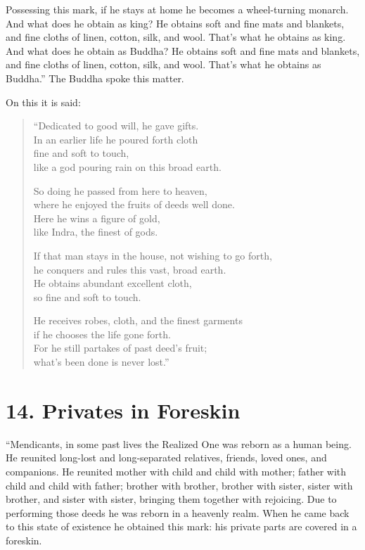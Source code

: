 \documentclass[12pt,openany]{book}%
\begin{document}
Possessing this mark, if he stays at home he becomes a wheel-turning monarch. And what does he obtain as king? He obtains soft and fine mats and blankets, and fine cloths of linen, cotton, silk, and wool. That’s what he obtains as king. And what does he obtain as Buddha? He obtains soft and fine mats and blankets, and fine cloths of linen, cotton, silk, and wool. That’s what he obtains as Buddha.” The Buddha spoke this matter. 

On this it is said: 

\begin{verse}%
“Dedicated to good will, he gave gifts. \\
In an earlier life he poured forth cloth \\
fine and soft to touch, \\
like a god pouring rain on this broad earth. 

So doing he passed from here to heaven, \\
where he enjoyed the fruits of deeds well done. \\
Here he wins a figure of gold, \\
like Indra, the finest of gods. 

If that man stays in the house, not wishing to go forth, \\
he conquers and rules this vast, broad earth. \\
He obtains abundant excellent cloth, \\
so fine and soft to touch. 

He receives robes, cloth, and the finest garments \\
if he chooses the life gone forth. \\
For he still partakes of past deed’s fruit; \\
what’s been done is never lost.” 

%
\end{verse}

\section*{14. Privates in Foreskin }

“Mendicants, in some past lives the Realized One was reborn as a human being. He reunited long-lost and long-separated relatives, friends, loved ones, and companions. He reunited mother with child and child with mother; father with child and child with father; brother with brother, brother with sister, sister with brother, and sister with sister, bringing them together with rejoicing. Due to performing those deeds he was reborn in a heavenly realm. When he came back to this state of existence he obtained this mark: his private parts are covered in a foreskin. 
\end{document}
